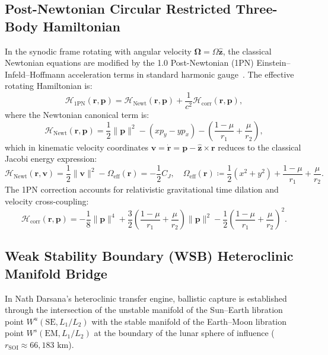 \documentclass[11pt,a4paper,reqno]{article}
\theoremstyle{plain}
\theoremstyle{definition}
\theoremstyle{remark}
\numberwithin{equation}{section}
\begin{document}
\subsection{Post-Newtonian Circular Restricted Three-Body Hamiltonian}
\label{subsec:1pn_cr3bp_hamiltonian}

In the synodic frame rotating with angular velocity $\bm{\Omega} = \Omega \hat{\bm{z}}$, the classical Newtonian equations are modified by the 1.0 Post-Newtonian (1PN) Einstein--Infeld--Hoffmann acceleration terms in standard harmonic gauge~\cite{EIH1938, Brumberg1991}. The effective rotating Hamiltonian is:
\begin{equation}
  \mathcal{H}_{\mathrm{1PN}}(\bm{r}, \bm{p}) = \mathcal{H}_{\mathrm{Newt}}(\bm{r}, \bm{p}) + \frac{1}{c^2} \mathcal{H}_{\mathrm{corr}}(\bm{r}, \bm{p}),
  \label{eq:1pn_hamiltonian}
\end{equation}
where the Newtonian canonical term is:
\begin{equation}
  \mathcal{H}_{\mathrm{Newt}}(\bm{r}, \bm{p}) = \frac{1}{2}\|\bm{p}\|^2 - (x p_y - y p_x) - \left( \frac{1-\mu}{r_1} + \frac{\mu}{r_2} \right),
  \label{eq:newtonian_synodic_hamiltonian}
\end{equation}
which in kinematic velocity coordinates $\bm{v} = \dot{\bm{r}} = \bm{p} - \hat{\bm{z}} \times \bm{r}$ reduces to the classical Jacobi energy expression:
\begin{equation}
  \mathcal{H}_{\mathrm{Newt}}(\bm{r}, \bm{v}) = \frac{1}{2}\|\bm{v}\|^2 - \Omega_{\mathrm{eff}}(\bm{r}) = -\frac{1}{2} C_J, \quad \Omega_{\mathrm{eff}}(\bm{r}) \coloneqq \frac{1}{2}(x^2 + y^2) + \frac{1-\mu}{r_1} + \frac{\mu}{r_2}.
\end{equation}
The 1PN correction accounts for relativistic gravitational time dilation and velocity cross-coupling:
\begin{equation}
  \mathcal{H}_{\mathrm{corr}}(\bm{r}, \bm{p}) = -\frac{1}{8}\|\bm{p}\|^4 + \frac{3}{2}\left( \frac{1-\mu}{r_1} + \frac{\mu}{r_2} \right) \|\bm{p}\|^2 - \frac{1}{2}\left( \frac{1-\mu}{r_1} + \frac{\mu}{r_2} \right)^2.
  \label{eq:1pn_correction_term}
\end{equation}

\subsection{Weak Stability Boundary (WSB) Heteroclinic Manifold Bridge}
\label{subsec:wsb_heteroclinic_bridge}

In Nath Darsana's heteroclinic transfer engine, ballistic capture is established through the intersection of the unstable manifold of the Sun--Earth libration point $W^u(\mathrm{SE}, L_1/L_2)$ with the stable manifold of the Earth--Moon libration point $W^s(\mathrm{EM}, L_1/L_2)$ at the boundary of the lunar sphere of influence ($r_{\mathrm{SOI}} \approx 66{,}183\text{ km}$). 
\end{document}
